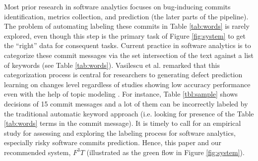 \documentclass[sigconf,review, anonymous]{acmart}
\begin{document}
Most prior research in software analytics focuses on bug-inducing commits identification, metrics collection, and prediction (the later parts of the pipeline). The problem of automating labeling these commits in Table \ref{tab:words}  is rarely explored, even though this step is the primary task of Figure \ref{fig:system} to get the ``right'' data for consequent tasks. Current practice in software analytics is to categorize these commit messages via the set intersection of the text against a list of keywords (see Table \ref{tab:words}). Vasilescu et al. \cite{Vasilescu15github} remarked that this categorization process is central for researchers to generating defect prediction learning on changes level \cite{commitguru, Kim08changes, catolino17_jitmobile, nayrolles18_clever} regardless of studies showing low accuracy performance even with the help of topic modeling \cite{fu05committopic}. For instance, Table \ref{tbl:sample} shows decisions of 15 commit messages and a lot of them can be incorrectly labeled by the traditional automatic
keyword approach (i.e. looking for presence of the Table \ref{tab:words} terms in the commit message).  It is timely to call for an empirical study for assessing and exploring the labeling process for software analytics, especially risky software commits prediction. Hence, this paper and our recommended system, $F^3T$ (illustrated as the green flow in Figure \ref{fig:system}).

 
 







 
 


\end{document}
